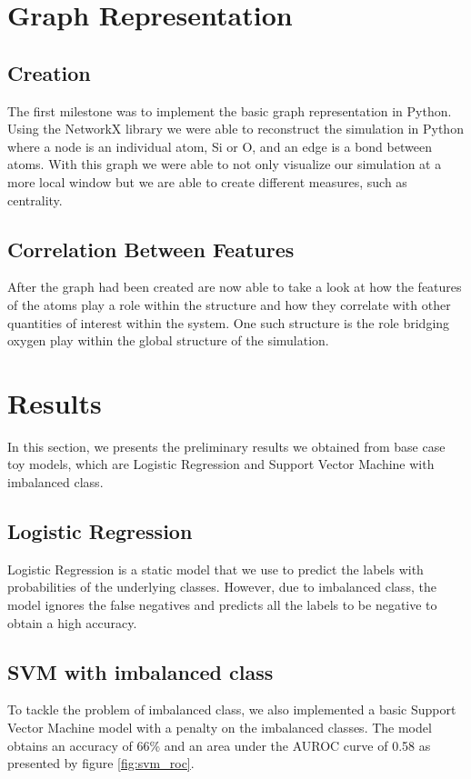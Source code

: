 \section{Graph Representation}

\subsection{Creation}The first milestone was to implement the basic graph representation in Python. Using the NetworkX library we were able to reconstruct the simulation in Python where a node is an individual atom, Si or O, and an edge is a bond between atoms. With this graph we were able to not only visualize our simulation at a more local window but we are able to create different measures, such as centrality. 

\subsection{Correlation Between Features}
After the graph had been created are now able to take a look at how the features of the atoms play a role within the structure and how they correlate with other quantities of interest within the system. One such structure is the role bridging oxygen play within the global structure of the simulation. 


\section{Results}
In this section, we presents the preliminary results we obtained from base case toy models, which are Logistic Regression and Support Vector Machine with imbalanced class.

\subsection{Logistic Regression}
Logistic Regression is a static model that we use to predict the labels with probabilities of the underlying classes. However, due to imbalanced class, the model ignores the false negatives and predicts all the labels to be negative to obtain a high accuracy. 

\subsection{SVM with imbalanced class}

To tackle the problem of imbalanced class, we also implemented a basic Support Vector Machine model with a penalty on the imbalanced classes. The model obtains an accuracy of 66\% and an area under the AUROC curve of 0.58 as presented by figure \ref{fig:svm_roc}.



